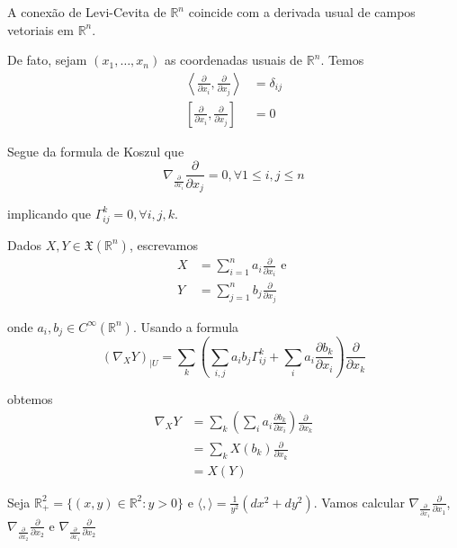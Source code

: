 \begin{obse}
	A conexão de Levi-Cevita de $\mathbb{R}^n$ coincide com a derivada usual de campos vetoriais em $\mathbb{R}^n$.
	
	De fato, sejam $(x_1,\ldots,x_n)$ as coordenadas usuais de $\mathbb{R}^n$. Temos
	\begin{align*}
		\left\langle \frac{\partial}{\partial x_i},\frac{\partial}{\partial x_j}\right\rangle &= \delta_{ij}\\
		\left[\frac{\partial}{\partial x_i},\frac{\partial}{\partial x_j}\right] &= 0
	\end{align*}
	
	Segue da formula de Koszul que
	\begin{equation*}
		\nabla_{\frac{\partial}{\partial x_i}} \frac{\partial}{\partial x_j} = 0, \forall 1 \leq i,j \leq n
	\end{equation*}
	
	implicando que $\Gamma_{ij}^k = 0, \forall i,j,k$. 
	
	Dados $X,Y \in \mathfrak{X}(\mathbb{R}^n)$, escrevamos
	\begin{align*}
		X &= \sum_{i=1}^n a_i \frac{\partial}{\partial x_i} \text{ e }\\
		Y &= \sum_{j=1}^n b_j \frac{\partial}{\partial x_j}
	\end{align*}
	
	onde $a_i,b_j \in C^{\infty}(\mathbb{R}^n)$. Usando a formula
	\begin{equation*}
		(\nabla_X Y)_{|U} = \sum_{k} \left(\sum_{i,j} a_i b_j \Gamma_{ij}^k + \sum_{i} a_i \frac{\partial b_k}{\partial x_i} \right) \frac{\partial}{\partial x_k}
	\end{equation*}
	
	obtemos
	\begin{align*}
		\nabla_X Y &= \sum_{k} \left(\sum_{i} a_i \frac{\partial b_k}{\partial x_i} \right) \frac{\partial}{\partial x_k}\\
		&= \sum_{k} X(b_k) \frac{\partial}{\partial x_k}\\
		&= X(Y)
	\end{align*}
\end{obse}

\begin{exemplo}
	Seja $\mathbb{R}_+^2 = \{(x,y) \in \mathbb{R}^2: y>0\}$ e $\langle,\rangle = \frac{1}{y^2} \left(dx^2+dy^2\right)$. Vamos calcular $\nabla_{\frac{\partial}{\partial x_1}} \frac{\partial}{\partial x_1}$, $\nabla_{\frac{\partial}{\partial x_2}} \frac{\partial}{\partial x_2}$ e $\nabla_{\frac{\partial}{\partial x_1}} \frac{\partial}{\partial x_2}$
\end{exemplo}